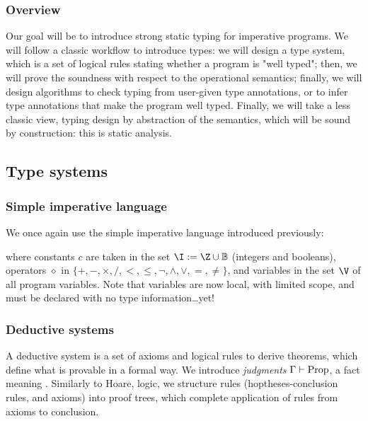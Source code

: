 \documentclass[toc, titlepaged]{../cs-classes/cs-classes}
\begin{document}
\subsubsection{Overview}
Our goal will be to introduce strong static typing for imperative programs. We will follow a classic workflow to introduce types: we will design a type system, which is a set of logical rules stating whether a program is "well typed"; then, we will prove the soundness with respect to the operational semantics; finally, we will design algorithms to check typing from user-given type annotations, or to infer type annotations that make the program well typed. Finally, we will take a less classic view, typing design by abstraction of the semantics, which will be sound by construction: this is static analysis.

\subsection{Type systems}
\subsubsection{Simple imperative language}
We once again use the simple imperative language introduced previously:
\begin{figure}[H]
    \centering
    \begin{grammar}

        \gskip{}

    \end{grammar}
\end{figure}
where constants $c$ are taken in the set $\I:=\Z\cup\B$ (integers and booleans), operators $\diamond$ in $\{+, -, \times, /, <, \leq, \lnot, \land, \lor, =, \neq\}$, and variables in the set $\V$ of all program variables. Note that variables are now local, with limited scope, and must be declared with no type information\dots yet!

\subsubsection{Deductive systems}
A deductive system is a set of axioms and logical rules to derive theorems, which define what is provable in a formal way. We introduce  \emph{judgments} $\Gamma\vdash \textnormal{Prop}$, a fact meaning . Similarly to Hoare, logic, we structure rules (hoptheses-conclusion rules, and axioms) into proof trees, which complete application of rules from axioms to conclusion.
\end{document}
